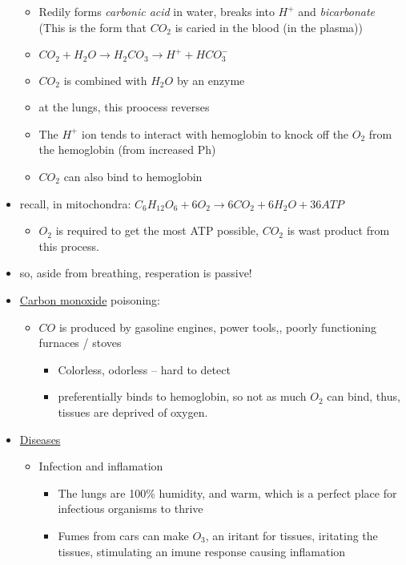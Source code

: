 \documentclass{article}
\theoremstyle{definition}
\begin{document}
\begin{itemize}
\begin{itemize}
			\item Redily forms \textit{carbonic acid}  in water, breaks into $H^+$ and \textit{bicarbonate} (This is the form that $CO_2$ is caried in the blood (in the plasma))
			\item $CO_2 + H_2O \to H_2CO_3 \to H^+ + HCO_3^-$
			\item $CO_2$ is combined with $H_2O$ by an enzyme
			\item at the lungs, this proocess reverses
			\item  The $H^+$ ion tends to interact with hemoglobin to knock off the $O_2$ from the hemoglobin (from increased Ph)
			\item $CO_2$ can also bind to hemoglobin
		\end{itemize}
	\item recall, in mitochondra: $C_6H_{12}O_6 + 6O_2 \to 6CO_2 + 6H_2O + 36ATP$
		\begin{itemize}
			\item $O_2$ is required to get the most ATP possible, $CO_2$ is wast product from this process.
		\end{itemize}
	\item so, aside from breathing, resperation is passive!
	\item \underline{Carbon monoxide} poisoning:
		\begin{itemize}
			\item $CO$ is produced by gasoline engines, power tools,, poorly functioning furnaces / stoves
				\begin{itemize}
					\item Colorless, odorless -- hard to detect
					\item preferentially binds to hemoglobin, so not as much $O_2$ can bind, thus, tissues are deprived of oxygen.
				\end{itemize}
		\end{itemize}
	\item \underline{Diseases}
		\begin{itemize}
			\item Infection and inflamation
				\begin{itemize}
					\item The lungs are 100\% humidity, and warm, which is a perfect place for infectious organisms to thrive
					\item Fumes from cars can make $O_3$, an iritant for tissues, iritating the tissues, stimulating an imune response causing inflamation
				\end{itemize}

\end{itemize}
\end{itemize}
\end{document}
